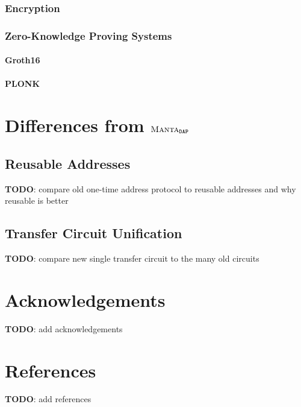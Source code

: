 \documentclass[a4paper]{article}
\newcommand{\subsubsubsection}[1]{\paragraph{#1}}
\newcommand{\lsection}[2]{\def\sectionlabel{#2} \section{#1}\label{sec:#2}}
\newcommand{\TODO}[1]{{\color{red}\textbf{TODO}}: #1}
\theoremstyle{definition}
\newcommand{\MantaDAP}{{\Manta{}_{\texttt{DAP}}}}
\newcommand{\Manta}{{\textsc{Manta}}}
\newcommand{\Transfer}{{\textsf{Transfer}}}
\begin{document}
\subsubsection{Encryption}

\subsubsection{Zero-Knowledge Proving Systems}

\subsubsubsection{Groth16}

\subsubsubsection{PLONK}

\lsection{Differences from $\MantaDAP$}{differences}

\subsection{Reusable Addresses}

\TODO{compare old one-time address protocol to reusable addresses and why reusable is better}

\subsection{\Transfer{} Circuit Unification}

\TODO{compare new single transfer circuit to the many old circuits}

\lsection{Acknowledgements}{acknowledgements}

\TODO{add acknowledgements}

\lsection{References}{references}

\TODO{add references}
\end{document}
